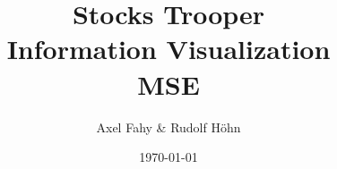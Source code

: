 \documentclass[11pt]{report}
\begin{document}
\title{Stocks Trooper\\Information Visualization\\MSE}
\date{\today}
\author{Axel Fahy \& Rudolf Höhn}
\maketitle

\tableofcontents

\pagestyle{fancy}     %







\appendix


\end{document}
